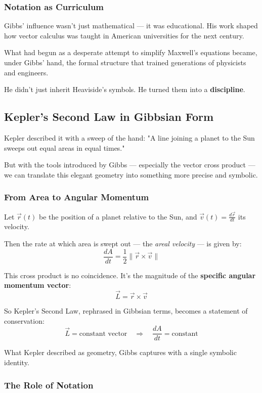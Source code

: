 \subsubsection*{Notation as Curriculum}

Gibbs’ influence wasn’t just mathematical — it was educational.  
His work shaped how vector calculus was taught in American universities for the next century.

What had begun as a desperate attempt to simplify Maxwell’s equations became, under Gibbs’ hand, the formal structure that trained generations of physicists and engineers.

He didn’t just inherit Heaviside’s symbols.  
He turned them into a \textbf{discipline}.

\subsection{Kepler’s Second Law in Gibbsian Form}

Kepler described it with a sweep of the hand:  
"A line joining a planet to the Sun sweeps out equal areas in equal times."

But with the tools introduced by Gibbs — especially the vector cross product — we can translate this elegant geometry into something more precise and symbolic.

\subsubsection*{From Area to Angular Momentum}

Let \( \vec{r}(t) \) be the position of a planet relative to the Sun, and \( \vec{v}(t) = \frac{d\vec{r}}{dt} \) its velocity.

Then the rate at which area is swept out — the \textit{areal velocity} — is given by:
\[
\frac{dA}{dt} = \frac{1}{2} \|\vec{r} \times \vec{v}\|
\]

This cross product is no coincidence. It’s the magnitude of the \textbf{specific angular momentum vector}:
\[
\vec{L} = \vec{r} \times \vec{v}
\]

So Kepler’s Second Law, rephrased in Gibbsian terms, becomes a statement of conservation:
\[
\vec{L} = \text{constant vector} \quad \Rightarrow \quad \frac{dA}{dt} = \text{constant}
\]

What Kepler described as geometry, Gibbs captures with a single symbolic identity.

\subsubsection*{The Role of Notation}

